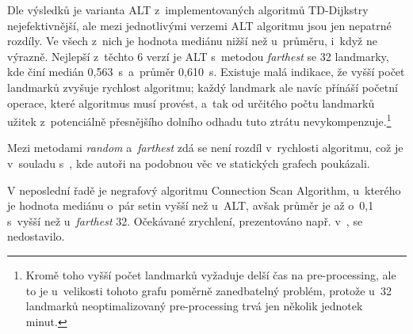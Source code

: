 Dle výsledků je varianta ALT z~implementovaných algoritmů TD-Dijkstry nejefektivnější, ale mezi jednotlivými verzemi ALT algoritmu jsou jen nepatrné rozdíly. Ve všech z~nich je hodnota mediánu nižší než u~průměru, i~když ne výrazně. Nejlepší z~těchto 6 verzí je ALT s~metodou \textit{farthest} se 32 landmarky, kde činí medián 0,563~s~a~průměr 0,610~s. Existuje malá indikace, že vyšší počet landmarků zvyšuje rychlost algoritmu; každý landmark ale navíc přínáší početní operace, které algoritmus musí provést, a~tak od určitého počtu landmarků užitek z~potenciálně přesnějšího dolního odhadu tuto ztrátu nevykompenzuje.\footnote{Kromě toho vyšší počet landmarků vyžaduje delší čas na pre-processing, ale to je u~velikosti tohoto grafu poměrně zanedbatelný problém, protože u~32 landmarků neoptimalizovaný pre-processing trvá jen několik jednotek minut.}

Mezi metodami \textit{random} a~\textit{farthest} zdá se není rozdíl v~rychlosti algoritmu, což je v~souladu s~\cite{goldberg05PointToPoint}, kde autoři na podobnou věc ve statických grafech poukázali.

V neposlední řadě je negrafový algoritmu Connection Scan Algorithm, u~kterého je hodnota mediánu o~pár setin vyšší než u~ALT, avšak průměr je až o~0,1 s~vyšší než u~\textit{farthest} 32. Očekávané zrychlení, prezentováno např. v~\cite{dibbelt2017CSA}, se nedostavilo. 


